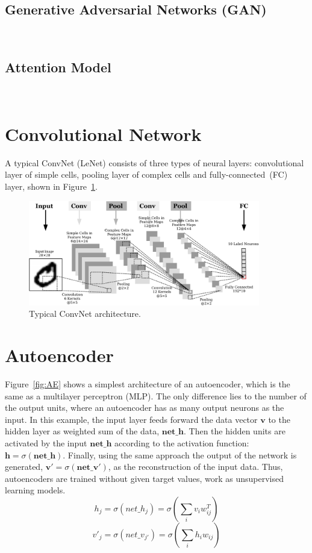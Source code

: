 \subsection{Generative Adversarial Networks (GAN)}~\cite{goodfellow2014generative}


\subsection{Attention Model}~\cite{bahdanau2014neural}



\section{Convolutional Network}
A typical ConvNet (LeNet) consists of three types of neural layers: convolutional layer of simple cells, pooling layer of complex cells and fully-connected~(FC) layer, shown in Figure~\ref{Fig:ConvNet}. 
	\begin{figure}[bt]
		\centering
		\includegraphics[width=0.9\textwidth]{pics_snn/convnet.pdf}
		\caption{Typical ConvNet architecture.}
		\label{Fig:ConvNet}
	\end{figure}



\section{Autoencoder}
\label{sec:AE}
Figure~\ref{fig:AE} shows a simplest architecture of an autoencoder, which is the same as a multilayer perceptron (MLP).
The only difference lies to the number of the output units, where an autoencoder has as many output neurons as the input.
In this example, the input layer feeds forward the data vector $\mathbf{v}$ to the hidden layer as weighted sum of the data, $\mathbf{net\_h}$.
Then the hidden units are activated by the input $\mathbf{net\_h}$ according to the activation function: $\mathbf{h}=\sigma(\mathbf{net\_h})$.
Finally, using the same approach the output of the network is generated, $\mathbf{v'}=\sigma(\mathbf{net\_v'})$, as the reconstruction of the input data.
Thus, autoencoders are trained without given target values, work as unsupervised learning models.
\begin{equation}
h_j=\sigma(net\_h_j)=\sigma(\sum_i v_i w^T_{ij})
\end{equation}
\begin{equation}
v'_j=\sigma(net\_v_{j'})=\sigma(\sum_i h_i w_{ij})
\end{equation}

